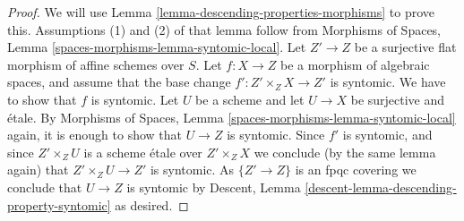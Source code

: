 \documentclass[10pt,a4paper]{amsart}
\theoremstyle{plain}
\theoremstyle{definition}
\theoremstyle{remark}
\numberwithin{equation}{subsection}
\begin{document}
\begin{proof}
We will use
Lemma \ref{lemma-descending-properties-morphisms}
to prove this. Assumptions (1) and (2) of that lemma follow from
Morphisms of Spaces,
Lemma \ref{spaces-morphisms-lemma-syntomic-local}.
Let $Z' \to Z$ be a surjective flat morphism of affine schemes over $S$.
Let $f : X \to Z$ be a morphism of algebraic spaces, and assume
that the base change $f' : Z' \times_Z X \to Z'$ is syntomic.
We have to show that $f$ is syntomic. Let $U$ be a scheme
and let $U \to X$ be surjective and \'etale. By
Morphisms of Spaces,
Lemma \ref{spaces-morphisms-lemma-syntomic-local}
again, it is enough to show that $U \to Z$ is syntomic.
Since $f'$ is syntomic, and since $Z' \times_Z U$ is a
scheme \'etale over $Z' \times_Z X$ we conclude (by the same lemma again) that
$Z' \times_Z U \to Z'$ is syntomic.
As $\{Z' \to Z\}$ is an fpqc covering we conclude that
$U \to Z$ is syntomic by
Descent, Lemma \ref{descent-lemma-descending-property-syntomic}
as desired.
\end{proof}
\end{document}
